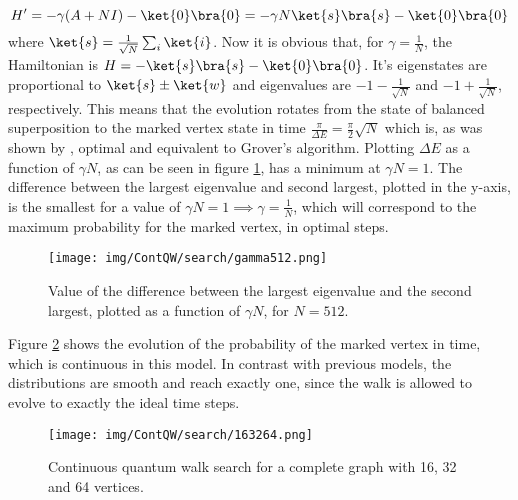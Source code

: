                 \begin{equation}
                    H' = -\gamma(A+NI) - \ket{0}\bra{0} = -\gamma N\ket{s}\bra{s} - \ket{0}\bra{0}
                \end{equation}
                where $\ket{s} = \frac{1}{\sqrt{N}}\sum_i \ket{i}$. Now it is obvious that, for $\gamma = \frac{1}{N}$, the Hamiltonian is $H = -\ket{s}\bra{s} - \ket{0}\bra{0}$. It's eigenstates are proportional to $\ket{s}\pm\ket{w}$ and eigenvalues are $-1 - \frac{1}{\sqrt{N}}$ and $-1 + \frac{1}{\sqrt{N}}$, respectively. This means that the evolution rotates from the state of balanced superposition to the marked vertex state in time $\frac{\pi}{\Delta E} = \frac{\pi}{2}\sqrt{N}$ which is, as was shown by \cite{zalka1999}, optimal and equivalent to Grover's algorithm. Plotting $\Delta E$ as a function of $\gamma N$, as can be seen in figure \ref{fig:gamma512}, has a minimum at $\gamma N =1$. The difference between the largest eigenvalue and second largest, plotted in the y-axis, is the smallest for a value of $\gamma N = 1 \implies \gamma =\frac{1}{N}$, which will correspond to the maximum probability for the marked vertex, in optimal steps.
                
                \begin{figure}[h]
                    \centering \texttt{[image: img/ContQW/search/gamma512.png]}
                     \caption{Value of the difference between the largest eigenvalue and the second largest, plotted as a function of $\gamma N$, for $N=512$. }\label{fig:ContSearch}
                     \label{fig:gamma512}
                \end{figure}
                
                Figure \ref{fig:ContSearch} shows the evolution of the probability of the marked vertex in time, which is continuous in this model. In contrast with previous models, the distributions are smooth and reach exactly one, since the walk is allowed to evolve to exactly the ideal time steps.
                
            	\begin{figure}[!t]
                    \centering \texttt{[image: img/ContQW/search/163264.png]}
                     \caption{Continuous quantum walk search for a complete graph with 16, 32 and 64 vertices.}\label{fig:ContSearch}
                \end{figure}
                
